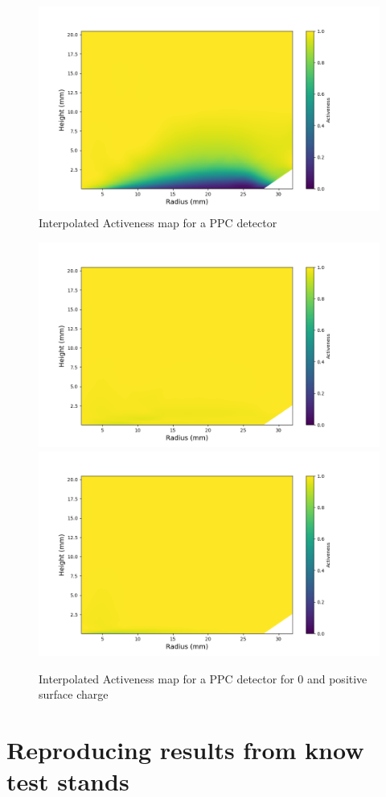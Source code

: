 \begin{figure}
\includegraphics[trim={1.4cm 0.5cm 3.2cm 1.755cm},clip,width=\linewidth]{ch5/figs/activeness_map_cubic_sc=-0.3_ponama_1_5000.png}
\caption{Interpolated Activeness map for a PPC detector \ehd}
\label{ch5:fig:interpolated_activeness_map}
\end{figure}

\begin{figure}
\includegraphics[trim={1.5cm 0cm 3.3cm 1cm},clip,width=0.49\linewidth]{ch5/figs/activeness_map_cubic_sc=0_ponama_1_5000.png}
\includegraphics[trim={1.5cm 0cm 3.3cm 1cm},clip,width=0.49\linewidth]{ch5/figs/activeness_map_cubic_sc=0.3_ponama_1_5000.png}
\caption{Interpolated Activeness map for a PPC detector \ehd for 0 and positive surface charge}
\label{ch5:fig:interpolated_activeness_map_0_pos}
\end{figure}


\section{\label{res:1} Reproducing results from know test stands}


